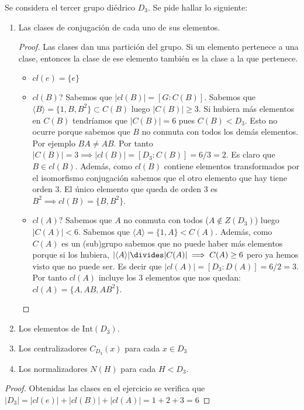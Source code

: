 \documentclass{book}
\theoremstyle{definition}
\theoremstyle{remark}
\newcommand{\gen}[1]{\langle#1\rangle}
\begin{document}
\begin{ex}[H2.1]
	\label{ex:h2.1}
	Se considera el tercer grupo diédrico $D_3$. Se pide hallar lo siguiente:
	\begin{enumerate}
		\item Las clases de conjugación de cada uno de sus elementos.
		\begin{proof}
			Las clases dan una partición del grupo. Si un elemento pertenece a una clase, entonces la clase de ese elemento también es la clase a la que pertenece.
			\begin{itemize}
				\item $cl(e) = \{e\}$
				\item $cl(B)$? Sabemos que $|cl(B)| = [G:C(B)]$. Sabemos que $\gen{B} =\{1, B, B^2\} \subset C(B)$ luego $|C(B)| \geq 3$. Si hubiera más elementos en $C(B)$ tendríamos que $|C(B)| = 6$ pues $C(B) < D_3$. Esto no ocurre porque sabemos que $B$ no conmuta con todos los demás elementos. Por ejemplo $BA \neq AB$. Por tanto $|C(B)| = 3 \implies |cl(B)| = [D_3:C(B)]= 6/3 = 2$. Es claro que $B \in cl(B)$. Además, como $cl(B)$ contiene elementos transformados por el isomorfismo conjugación sabemos que el otro elemento que hay tiene orden 3. El único elemento que queda de orden 3 es $B^2 \implies cl(B) = \{B, B^2\}$.
				
				\item $cl(A)?$ Sabemos que $A$ no conmuta con todos ($A \not\in Z(D_3)$) luego $|C(A)| < 6$. Sabemos que $\gen{A} = \{1, A\} < C(A)$. Además, como $C(A)$ es un (sub)grupo sabemos que no puede haber más elementos porque si los hubiera, $|\gen{A}| \divides |C(A)| \implies C(A) \geq 6$ pero ya hemos visto que no puede ser. Es decir que $|cl(A)| = [D_3:D(A)] = 6 / 2 = 3$. Por tanto $cl(A)$ incluye los 3 elementos que nos quedan: $cl(A) = \{A, AB, AB^2\}$.
			\end{itemize}
		\end{proof}
	
		\item Los elementos de $\text{Int}(D_3)$.
		\item Los centralizadores $C_{D_3}(x)$ para cada $x \in D_3$
		\item Los normalizadores $N(H)$ para cada $H < D_3$.
	\end{enumerate}
\end{ex}

\begin{ex}[H2.2]
	
	\begin{proof}
		Obtenidas las clases en el ejercicio  se verifica que $|D_3| = |cl(e)| + |cl(B)| + |cl(A)| = 1 + 2 + 3 = 6$
	\end{proof}
	
\end{ex}
\end{document}
